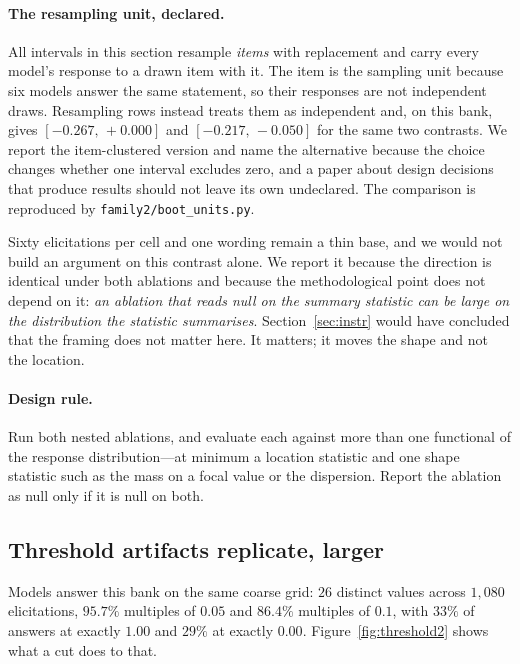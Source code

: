 \paragraph{The resampling unit, declared.} All intervals in this section resample \emph{items}
with replacement and carry every model's response to a drawn item with it. The item is the
sampling unit because six models answer the same statement, so their responses are not
independent draws. Resampling rows instead treats them as independent and, on this bank, gives
$[-0.267,\,+0.000]$ and $[-0.217,\,-0.050]$ for the same two contrasts. We report the
item-clustered version and name the alternative because the choice changes whether one interval
excludes zero, and a paper about design decisions that produce results should not leave its own
undeclared. The comparison is reproduced by \texttt{family2/boot\_units.py}.

Sixty elicitations per cell and one wording remain a thin base, and we would not build an
argument on this contrast alone. We report it because the direction is identical under both
ablations and because the methodological point does not depend on it:
\emph{an ablation that reads null on the summary statistic can be large on the distribution the
statistic summarises}. Section~\ref{sec:instr} would have concluded that the framing does not
matter here. It matters; it moves the shape and not the location.

\paragraph{Design rule.} Run both nested ablations, and evaluate each against more than one
functional of the response distribution---at minimum a location statistic and one shape statistic
such as the mass on a focal value or the dispersion. Report the ablation as null only if it is
null on both.

\subsection{Threshold artifacts replicate, larger}

Models answer this bank on the same coarse grid: $26$ distinct values across $1{,}080$
elicitations, $95.7\%$ multiples of $0.05$ and $86.4\%$ multiples of $0.1$, with $33\%$ of answers
at exactly $1.00$ and $29\%$ at exactly $0.00$. Figure~\ref{fig:threshold2} shows what a cut does
to that.

